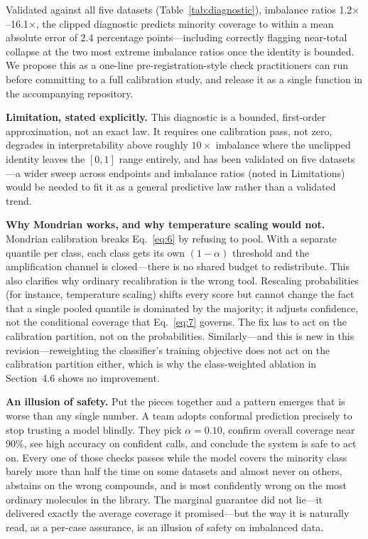 \documentclass[11pt]{article}
\begin{document}
Validated against all five datasets (Table~\ref{tab:diagnostic}), imbalance ratios
1.2$\times$--16.1$\times$, the clipped diagnostic predicts minority coverage to within a mean
absolute error of 2.4 percentage points---including correctly flagging near-total collapse at the
two most extreme imbalance ratios once the identity is bounded. We propose this as a one-line
pre-registration-style check practitioners can run before committing to a full calibration study,
and release it as a single function in the accompanying repository.

\textbf{Limitation, stated explicitly.} This diagnostic is a bounded, first-order approximation,
not an exact law. It requires one calibration pass, not zero, degrades in interpretability above
roughly $10\times$ imbalance where the unclipped identity leaves the $[0,1]$ range entirely, and
has been validated on five datasets---a wider sweep across endpoints and imbalance ratios (noted in
Limitations) would be needed to fit it as a general predictive law rather than a validated trend.

\textbf{Why Mondrian works, and why temperature scaling would not.} Mondrian calibration breaks
Eq.~\ref{eq:6} by refusing to pool. With a separate quantile per class, each class gets its own
$(1-\alpha)$ threshold and the amplification channel is closed---there is no shared budget to
redistribute. This also clarifies why ordinary recalibration is the wrong tool. Rescaling
probabilities (for instance, temperature scaling) shifts every score but cannot change the fact
that a single pooled quantile is dominated by the majority; it adjusts confidence, not the
conditional coverage that Eq.~\ref{eq:7} governs. The fix has to act on the calibration partition,
not on the probabilities. Similarly---and this is new in this revision---reweighting the
classifier's training objective does not act on the calibration partition either, which is why the
class-weighted ablation in Section~4.6 shows no improvement.

\textbf{An illusion of safety.} Put the pieces together and a pattern emerges that is worse than any
single number. A team adopts conformal prediction precisely to stop trusting a model blindly. They
pick $\alpha=0.10$, confirm overall coverage near 90\%, see high accuracy on confident calls, and
conclude the system is safe to act on. Every one of those checks passes while the model covers the
minority class barely more than half the time on some datasets and almost never on others, abstains
on the wrong compounds, and is most confidently wrong on the most ordinary molecules in the library.
The marginal guarantee did not lie---it delivered exactly the average coverage it
promised---but the way it is naturally read, as a per-case assurance, is an illusion of safety on
imbalanced data.
\end{document}
